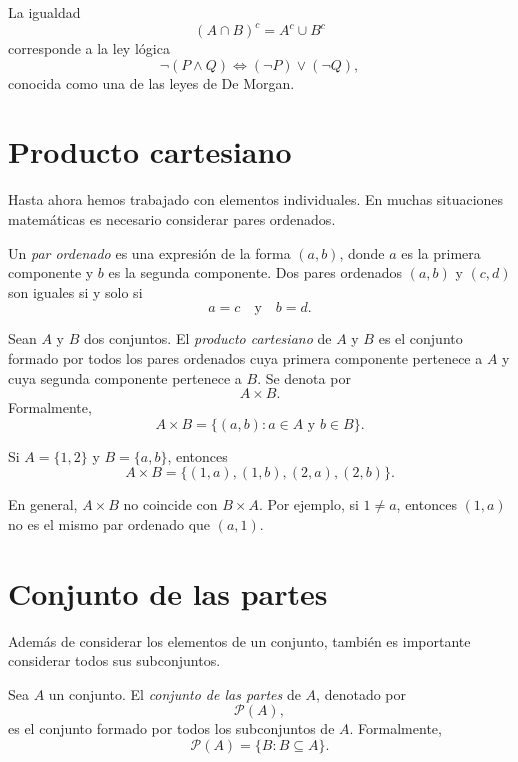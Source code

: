 \begin{ejemplo}
La igualdad
\[
  (A\cap B)^c=A^c\cup B^c
\]
corresponde a la ley lógica
\[
  \neg(P\wedge Q) \Longleftrightarrow (\neg P)\vee(\neg Q),
\]
conocida como una de las leyes de De Morgan.
\end{ejemplo}

\section{Producto cartesiano}

Hasta ahora hemos trabajado con elementos individuales. En muchas situaciones matemáticas es necesario considerar pares ordenados.

\begin{definicion}
Un \emph{par ordenado} es una expresión de la forma \((a,b)\), donde \(a\) es la primera componente y \(b\) es la segunda componente. Dos pares ordenados \((a,b)\) y \((c,d)\) son iguales si y solo si
\[
  a=c \quad \text{y} \quad b=d.
\]
\end{definicion}

\begin{definicion}
Sean \(A\) y \(B\) dos conjuntos. El \emph{producto cartesiano} de \(A\) y \(B\) es el conjunto formado por todos los pares ordenados cuya primera componente pertenece a \(A\) y cuya segunda componente pertenece a \(B\). Se denota por
\[
  A\times B.
\]
Formalmente,
\[
  A\times B=\{(a,b): a\in A \text{ y } b\in B\}.
\]
\end{definicion}

\begin{ejemplo}
Si \(A=\{1,2\}\) y \(B=\{a,b\}\), entonces
\[
  A\times B=\{(1,a),(1,b),(2,a),(2,b)\}.
\]
\end{ejemplo}

\begin{advertencia}
En general, \(A\times B\) no coincide con \(B\times A\). Por ejemplo, si \(1\neq a\), entonces \((1,a)\) no es el mismo par ordenado que \((a,1)\).
\end{advertencia}

\section{Conjunto de las partes}

Además de considerar los elementos de un conjunto, también es importante considerar todos sus subconjuntos.

\begin{definicion}
Sea \(A\) un conjunto. El \emph{conjunto de las partes} de \(A\), denotado por
\[
  \mathcal{P}(A),
\]
es el conjunto formado por todos los subconjuntos de \(A\). Formalmente,
\[
  \mathcal{P}(A)=\{B: B\subseteq A\}.
\]
\end{definicion}

